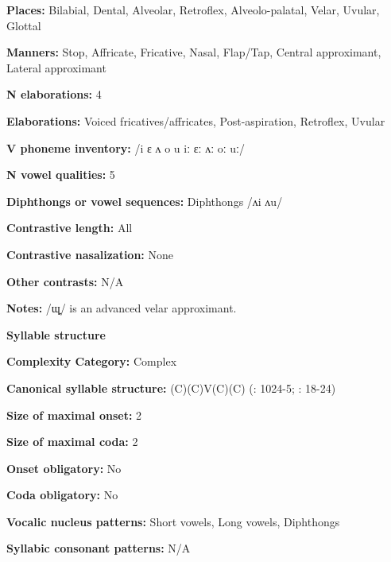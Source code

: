 \textbf{Places:} Bilabial, Dental, Alveolar, Retroflex, Alveolo-palatal, Velar, Uvular, Glottal



\textbf{Manners:} Stop, Affricate, Fricative, Nasal, Flap/Tap, Central approximant, Lateral approximant



\textbf{N elaborations:} 4



\textbf{Elaborations:} Voiced fricatives/affricates, Post-aspiration, Retroflex, Uvular



\textbf{V phoneme inventory:} /i ɛ ʌ o u iː ɛː ʌː oː uː/



\textbf{N vowel qualities:} 5



\textbf{Diphthongs or vowel sequences:} Diphthongs /ʌi ʌu/



\textbf{Contrastive length:} All



\textbf{Contrastive nasalization:} None



\textbf{Other contrasts:} N/A



\textbf{Notes:} /ɰ̟/ is an advanced velar approximant.



\textbf{Syllable structure}



\textbf{Complexity Category:} Complex



\textbf{Canonical syllable structure:} (C)(C)V(C)(C) (\citealt{Anderson1997}: 1024-5; \citealt{Yoshioka2012}: 18-24)



\textbf{Size of maximal onset:} 2



\textbf{Size of maximal coda:} 2



\textbf{Onset obligatory:} No



\textbf{Coda obligatory:} No



\textbf{Vocalic nucleus patterns:} Short vowels, Long vowels, Diphthongs



\textbf{Syllabic consonant patterns:} N/A



